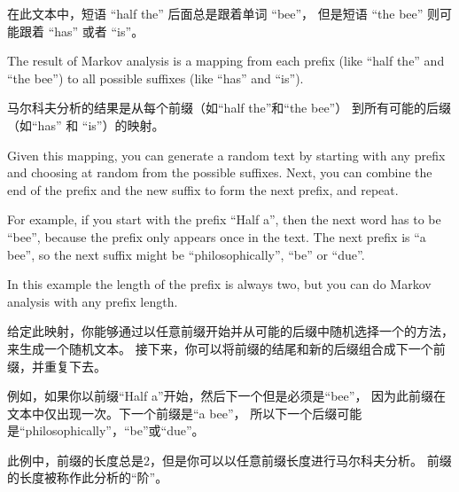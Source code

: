 在此文本中，短语 ``half the'' 后面总是跟着单词 ``bee''， 但是短语 ``the
bee'' 则可能跟着 ``has'' 或者  ``is''。


The result of Markov analysis is a mapping from each prefix
(like ``half the'' and ``the bee'') to all possible suffixes
(like ``has'' and ``is'').

马尔科夫分析的结果是从每个前缀（如``half the''和``the bee''）
到所有可能的后缀（如``has'' 和 ``is''）的映射。


Given this mapping, you can generate a random text by
starting with any prefix and choosing at random from the
possible suffixes.  Next, you can combine the end of the
prefix and the new suffix to form the next prefix, and repeat.

For example, if you start with the prefix ``Half a'', then the
next word has to be ``bee'', because the prefix only appears
once in the text.  The next prefix is ``a bee'', so the
next suffix might be ``philosophically'', ``be'' or ``due''.

In this example the length of the prefix is always two, but
you can do Markov analysis with any prefix length.

给定此映射，你能够通过以任意前缀开始并从可能的后缀中随机选择一个的方法，来生成一个随机文本。
接下来，你可以将前缀的结尾和新的后缀组合成下一个前缀，并重复下去。

例如，如果你以前缀``Half a''开始，然后下一个但是必须是``bee''，
因为此前缀在文本中仅出现一次。下一个前缀是``a bee''，
所以下一个后缀可能是``philosophically''，``be''或``due''。

此例中，前缀的长度总是2，但是你可以以任意前缀长度进行马尔科夫分析。
前缀的长度被称作此分析的“阶”。

